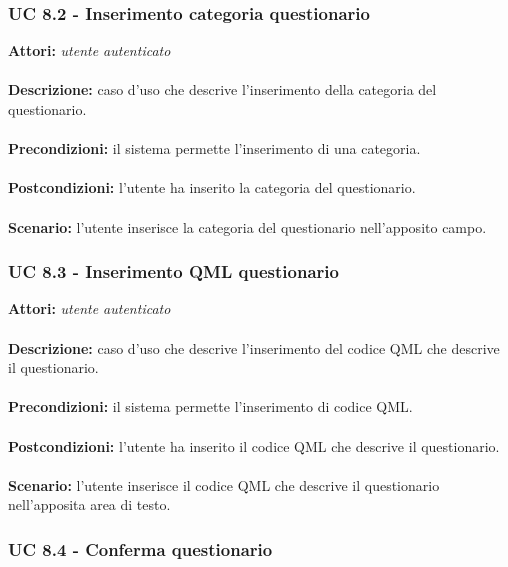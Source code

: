 \documentclass[a4paper,11pt]{article}
\begin{document}
\subsubsection{UC 8.2 - Inserimento categoria questionario}

\textbf{Attori:} \textit{utente autenticato}
\\ \\
\textbf{Descrizione:} caso d'uso che descrive l'inserimento della categoria del questionario.\\
\\
\textbf{Precondizioni:} il sistema permette l'inserimento di una categoria.\\
\\
\textbf{Postcondizioni:} l’utente ha inserito la categoria del questionario.\\
\\
\textbf{Scenario:} l’utente inserisce la categoria del questionario nell'apposito campo.\\


\subsubsection{UC 8.3 - Inserimento QML questionario}

\textbf{Attori:} \textit{utente autenticato}
\\ \\
\textbf{Descrizione:} caso d'uso che descrive l'inserimento del codice QML che descrive il questionario.\\
\\
\textbf{Precondizioni:} il sistema permette l'inserimento di codice QML.\\
\\
\textbf{Postcondizioni:} l’utente ha inserito il codice QML che descrive il questionario.\\
\\
\textbf{Scenario:} l’utente inserisce il codice QML che descrive il questionario nell'apposita area di testo.\\


\subsubsection{UC 8.4 - Conferma questionario}
\end{document}
